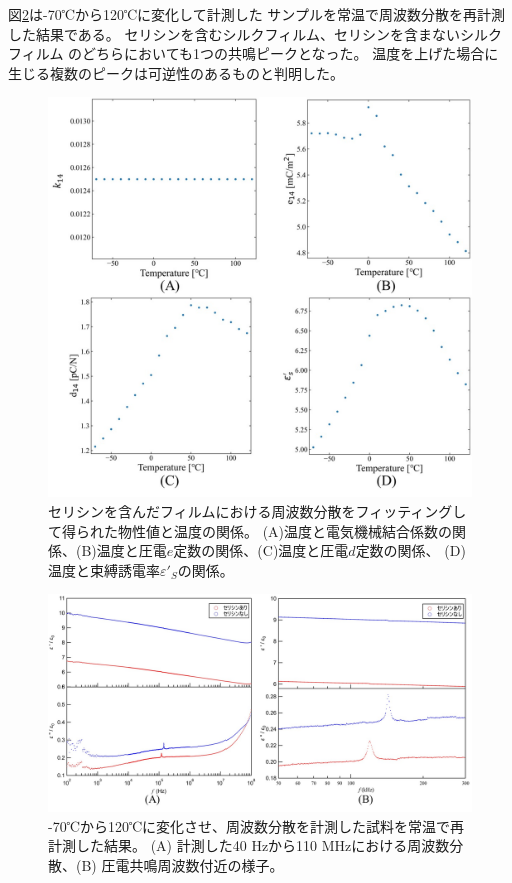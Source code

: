 \documentclass[dvipdfmx,12pt,a4paper]{jreport}
\begin{document}
			図\ref{熱処理後の誘電率}は-70℃から120℃に変化して計測した
			サンプルを常温で周波数分散を再計測した結果である。
			セリシンを含むシルクフィルム、セリシンを含まないシルクフィルム
			のどちらにおいても1つの共鳴ピークとなった。
			温度を上げた場合に生じる複数のピークは可逆性のあるものと判明した。
			\begin{figure}[h]
				\centering
				\includegraphics[scale=0.8]{温度_k_e_d_セリシンあり.jpg}
				\caption{セリシンを含んだフィルムにおける周波数分散をフィッティングして得られた物性値と温度の関係。
				(A)温度と電気機械結合係数の関係、(B)温度と圧電$e$定数の関係、(C)温度と圧電$d$定数の関係、
				(D)温度と束縛誘電率$\varepsilon'_S$の関係。}
				\label{温度_d_e_セリシンあり}
			\end{figure}
			\newpage
			\begin{figure}[h]
				\centering
				\includegraphics[width=\linewidth]{熱処理後_誘電率_周波数分散.jpg}
				\caption{-70℃から120℃に変化させ、周波数分散を計測した試料を常温で再計測した結果。
				(A) 計測した40 Hzから110 MHzにおける周波数分散、(B) 圧電共鳴周波数付近の様子。}
				\label{熱処理後の誘電率}
			\end{figure}
\end{document}
